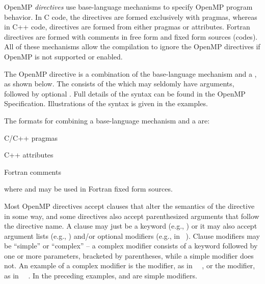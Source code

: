 \label{chap:directive_syntax}

OpenMP \emph{directives} use base-language mechanisms to specify OpenMP program behavior.
In C code, the directives are formed exclusively with pragmas, whereas in C++
code, directives are formed from either pragmas or attributes.
Fortran directives are formed with comments in free form and fixed form sources (codes).
All of these mechanisms allow the compilation to ignore the OpenMP directives if
OpenMP is not supported or enabled.


The OpenMP directive is a combination of the base-language mechanism and a ,
as shown below. The  consists
of the  which may seldomly have arguments, 
followed by optional . Full details of the syntax can be found in the OpenMP Specification.
Illustrations of the syntax is given in the examples.

The formats for combining a base-language mechanism and a  are:

C/C++ pragmas
\begin{indentedcodelist}
 
\end{indentedcodelist}

C++ attributes
\begin{indentedcodelist}
\code{[[omp :: directive(}  \code{)]]}
\code{[[using omp : directive(}  \code{)]]}
\end{indentedcodelist}

Fortran comments
\begin{indentedcodelist}
 
\end{indentedcodelist}

where  and  may be used in Fortran fixed form sources.

Most OpenMP directives accept clauses that alter the semantics of the directive in some way, 
and some directives also accept parenthesized arguments that follow the directive name. 
A clause may just be a keyword (e.g., ) or it may also accept argument lists 
(e.g., ) and/or optional modifiers (e.g.,  in 
~).
Clause modifiers may be ``simple'' or ``complex'' -- a complex modifier consists of a
keyword followed by one or more parameters, bracketed by parentheses, while a simple 
modifier does not. An example of a complex modifier is the  modifier, 
as in ~~, or the  modifier, as in 
~~. 
In the preceding examples,  and  are simple modifiers.

